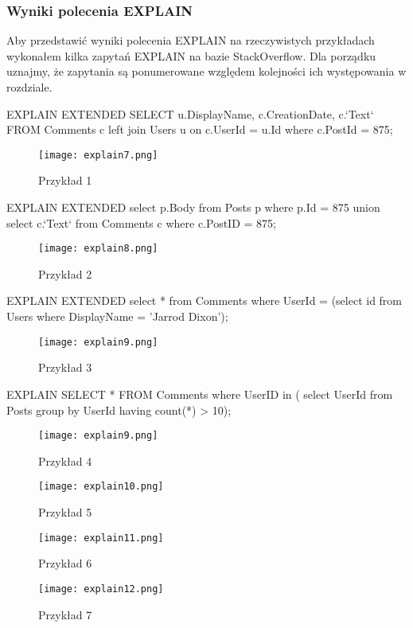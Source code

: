 \subsubsection{Wyniki polecenia EXPLAIN}
Aby przedstawić wyniki polecenia EXPLAIN na rzeczywistych przykładach wykonałem kilka zapytań EXPLAIN na bazie StackOverflow. Dla porządku uznajmy, że zapytania są ponumerowane względem kolejności ich występowania w rozdziale.
\begin{spverbatim}
	EXPLAIN EXTENDED SELECT u.DisplayName, c.CreationDate, c.`Text` FROM  Comments c left join Users u on c.UserId = u.Id where c.PostId = 875;
\end{spverbatim}
\begin{figure}[h]
	\texttt{[image: explain7.png]} 
	\caption{Przykład 1}
\end{figure}
\begin{spverbatim}
	EXPLAIN EXTENDED select p.Body from Posts p where p.Id = 875 union
	select c.`Text` from Comments c where c.PostID = 875;
\end{spverbatim}
\begin{figure}[h]
	\texttt{[image: explain8.png]} 
	\caption{Przykład 2}
\end{figure}
\begin{spverbatim}
	EXPLAIN EXTENDED select * from Comments where UserId = (select id from Users where DisplayName = 'Jarrod Dixon');
\end{spverbatim}
\begin{figure}[h]
	\texttt{[image: explain9.png]} 
	\caption{Przykład 3}
\end{figure}
\begin{spverbatim}
	EXPLAIN SELECT * FROM Comments where UserID in ( select UserId from Posts group by UserId having count(*) > 10);
\end{spverbatim}
\begin{figure}[h]
	\texttt{[image: explain9.png]} 
	\caption{Przykład 4}
\end{figure}
\begin{figure}[h]
	\texttt{[image: explain10.png]} 
	\caption{Przykład 5}
\end{figure}
\begin{figure}[h]
	\texttt{[image: explain11.png]} 
	\caption{Przykład 6}
\end{figure}
\begin{figure}[h]
	\texttt{[image: explain12.png]} 
	\caption{Przykład 7}
\end{figure}



